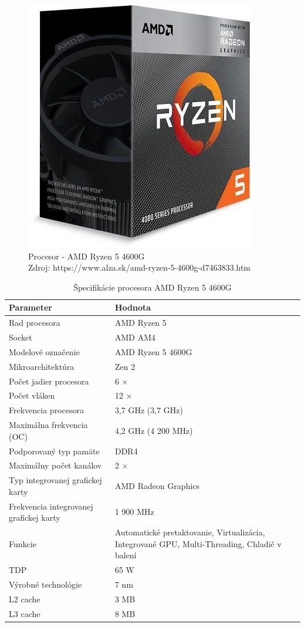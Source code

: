\documentclass[12pt,oneside,slovak,a4paper]{article}
\begin{document}
\begin{figure}[H]
	\centering
	\captionsetup{justification=centering,margin=2cm}
	\includegraphics[scale=0.5]{./images/cpu.png} %
	\centering
	\caption{Procesor - AMD Ryzen 5 4600G \\ Zdroj: https://www.alza.sk/amd-ryzen-5-4600g-d7463833.htm}
\end{figure}

\begin{table}[h]
\centering
\begin{tabularx}{\textwidth}{|l|X|}
\hline
\textbf{Parameter} & \textbf{Hodnota} \\ \hline
Rad procesora & AMD Ryzen 5 \\ \hline
Socket & AMD AM4 \\ \hline
Modelové označenie & AMD Ryzen 5 4600G \\ \hline
Mikroarchitektúra & Zen 2 \\ \hline
Počet jadier procesora & 6 × \\ \hline
Počet vláken & 12 × \\ \hline
Frekvencia procesora & 3,7 GHz (3,7 GHz) \\ \hline
Maximálna frekvencia (OC) & 4,2 GHz (4 200 MHz) \\ \hline
Podporovaný typ pamäte & DDR4 \\ \hline
Maximálny počet kanálov & 2 × \\ \hline
Typ integrovanej grafickej karty & AMD Radeon Graphics \\ \hline
Frekvencia integrovanej grafickej karty & 1 900 MHz \\ \hline
Funkcie & Automatické pretaktovanie, Virtualizácia, Integrované GPU, Multi-Threading, Chladič v balení \\ \hline
TDP & 65 W \\ \hline
Výrobné technológie & 7 nm \\ \hline
L2 cache & 3 MB \\ \hline
L3 cache & 8 MB \\ \hline
\end{tabularx}
\caption{Špecifikácie procesora AMD Ryzen 5 4600G}
\end{table}
\end{document}

